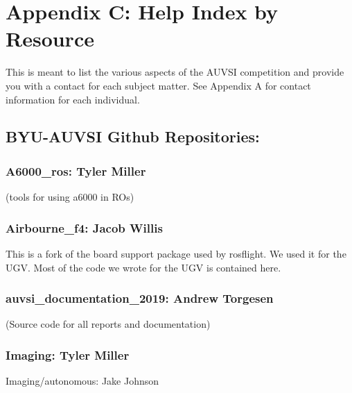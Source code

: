 \documentclass[]{auvsi_doc}
\begin{document}
\section{Appendix C: Help Index by Resource}

{This is meant to list the various aspects of the AUVSI competition and
provide you with a contact for each subject matter. See Appendix A for
contact information for each individual. }

\hypertarget{h.fzoo3toav61z}{\subsection{\texorpdfstring{{BYU-AUVSI
Github
Repositories:}}{BYU-AUVSI Github Repositories:}}\label{h.fzoo3toav61z}}

\hypertarget{h.ez5i7wokvzkz}{\subsubsection{\texorpdfstring{{A6000\_ros:
Tyler Miller}}{A6000\_ros: Tyler Miller}}\label{h.ez5i7wokvzkz}}

{(tools for using a6000 in ROs)}

\hypertarget{h.40v6z6uc89r7}{\subsubsection{\texorpdfstring{{Airbourne\_f4:
Jacob Willis}}{Airbourne\_f4: Jacob Willis}}\label{h.40v6z6uc89r7}}

{This is a fork of the board support package used by rosflight. We used
it for the UGV. Most of the code we wrote for the UGV is contained
here.}

\hypertarget{h.smcq1h7rkxh}{\subsubsection{\texorpdfstring{{auvsi\_documentation\_2019:
Andrew
Torgesen}}{auvsi\_documentation\_2019: Andrew Torgesen}}\label{h.smcq1h7rkxh}}

{(Source code for all reports and documentation)}

\hypertarget{h.mabru5lpfx9n}{\subsubsection{\texorpdfstring{{Imaging:
Tyler Miller}}{Imaging: Tyler Miller}}\label{h.mabru5lpfx9n}}

{Imaging/autonomous: Jake Johnson}
\end{document}
